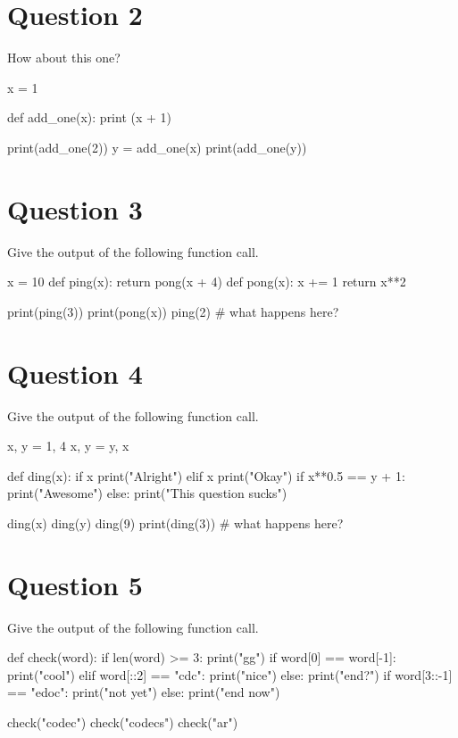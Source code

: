 \section{Question 2}
How about this one?
\begin{python}
  x = 1

  def add_one(x):
    print (x + 1)

  print(add_one(2))
  y = add_one(x)
  print(add_one(y))
\end{python}

\section{Question 3}
Give the output of the following function call.
\begin{python}
  x = 10
  def ping(x):
    return pong(x + 4)
  def pong(x):
    x += 1
    return x**2
  
  print(ping(3))
  print(pong(x))
  ping(2) # what happens here?
\end{python}

\section{Question 4}
Give the output of the following function call.
\begin{python}
  x, y = 1, 4
  x, y = y, x

  def ding(x):
    if x %
      print("Alright")
    elif x %
      print("Okay")
    if x**0.5 == y + 1:
      print("Awesome")
    else:
      print("This question sucks")

  ding(x)
  ding(y)
  ding(9)
  print(ding(3))  # what happens here?
\end{python}

\section{Question 5}
Give the output of the following function call.
\begin{python}
  def check(word):
    if len(word) >= 3:
      print("gg")
    if word[0] == word[-1]:
      print("cool")
    elif word[::2] == "cdc":
      print("nice")
    else:
      print("end?")
    if word[3::-1] == "edoc":
      print("not yet")
    else:
      print("end now")
    
  check("codec")
  check("codecs")
  check("ar")
\end{python}

